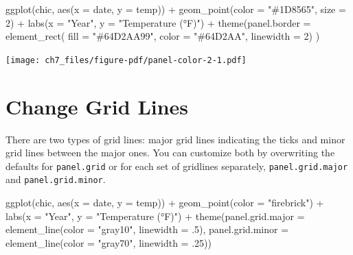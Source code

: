 \documentclass[
  letterpaper,
]{scrbook}
\newenvironment{Shaded}{\begin{snugshade}}{\end{snugshade}}
\newcommand{\AttributeTok}[1]{\textcolor[rgb]{0.40,0.45,0.13}{#1}}
\newcommand{\DecValTok}[1]{\textcolor[rgb]{0.68,0.00,0.00}{#1}}
\newcommand{\FunctionTok}[1]{\textcolor[rgb]{0.28,0.35,0.67}{#1}}
\newcommand{\NormalTok}[1]{\textcolor[rgb]{0.00,0.23,0.31}{#1}}
\newcommand{\SpecialCharTok}[1]{\textcolor[rgb]{0.37,0.37,0.37}{#1}}
\newcommand{\StringTok}[1]{\textcolor[rgb]{0.13,0.47,0.30}{#1}}
\begin{document}
\begin{Shaded}
\begin{Highlighting}[]
\FunctionTok{ggplot}\NormalTok{(chic, }\FunctionTok{aes}\NormalTok{(}\AttributeTok{x =}\NormalTok{ date, }\AttributeTok{y =}\NormalTok{ temp)) }\SpecialCharTok{+}
  \FunctionTok{geom\_point}\NormalTok{(}\AttributeTok{color =} \StringTok{"\#1D8565"}\NormalTok{, }\AttributeTok{size =} \DecValTok{2}\NormalTok{) }\SpecialCharTok{+}
  \FunctionTok{labs}\NormalTok{(}\AttributeTok{x =} \StringTok{"Year"}\NormalTok{, }\AttributeTok{y =} \StringTok{"Temperature (°F)"}\NormalTok{) }\SpecialCharTok{+}
  \FunctionTok{theme}\NormalTok{(}\AttributeTok{panel.border =} \FunctionTok{element\_rect}\NormalTok{(}
    \AttributeTok{fill =} \StringTok{"\#64D2AA99"}\NormalTok{, }\AttributeTok{color =} \StringTok{"\#64D2AA"}\NormalTok{, }\AttributeTok{linewidth =} \DecValTok{2}\NormalTok{)}
\NormalTok{  )}
\end{Highlighting}
\end{Shaded}

\texttt{[image: ch7\_files/figure-pdf/panel-color-2-1.pdf]}

\section{Change Grid Lines}\label{change-grid-lines}

There are two types of grid lines: major grid lines indicating the ticks
and minor grid lines between the major ones. You can customize both by
overwriting the defaults for \texttt{panel.grid} or for each set of
gridlines separately, \texttt{panel.grid.major} and
\texttt{panel.grid.minor}.

\begin{Shaded}
\begin{Highlighting}[]
\FunctionTok{ggplot}\NormalTok{(chic, }\FunctionTok{aes}\NormalTok{(}\AttributeTok{x =}\NormalTok{ date, }\AttributeTok{y =}\NormalTok{ temp)) }\SpecialCharTok{+}
  \FunctionTok{geom\_point}\NormalTok{(}\AttributeTok{color =} \StringTok{"firebrick"}\NormalTok{) }\SpecialCharTok{+}
  \FunctionTok{labs}\NormalTok{(}\AttributeTok{x =} \StringTok{"Year"}\NormalTok{, }\AttributeTok{y =} \StringTok{"Temperature (°F)"}\NormalTok{) }\SpecialCharTok{+}
  \FunctionTok{theme}\NormalTok{(}\AttributeTok{panel.grid.major =} \FunctionTok{element\_line}\NormalTok{(}\AttributeTok{color =} \StringTok{"gray10"}\NormalTok{, }\AttributeTok{linewidth =}\NormalTok{ .}\DecValTok{5}\NormalTok{),}
        \AttributeTok{panel.grid.minor =} \FunctionTok{element\_line}\NormalTok{(}\AttributeTok{color =} \StringTok{"gray70"}\NormalTok{, }\AttributeTok{linewidth =}\NormalTok{ .}\DecValTok{25}\NormalTok{))}
\end{Highlighting}
\end{Shaded}
\end{document}
